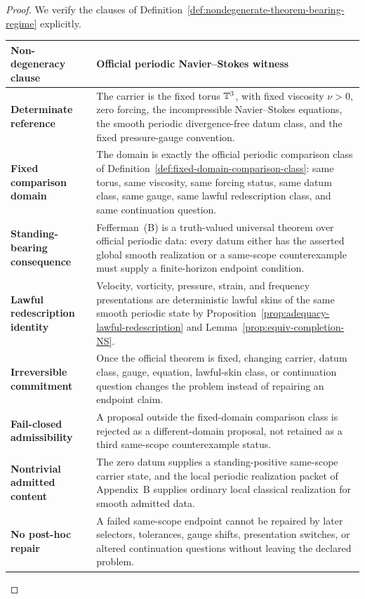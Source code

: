 \begin{proof}
We verify the clauses of Definition~\ref{def:nondegenerate-theorem-bearing-regime} explicitly.
\begin{center}
\footnotesize
\renewcommand{\arraystretch}{1.12}
\setlength{\tabcolsep}{4pt}
\begin{tabularx}{0.98\textwidth}{@{}L{0.31\textwidth}Y@{}}
\toprule
\textbf{Non-degeneracy clause} & \textbf{Official periodic Navier--Stokes witness}\\
\midrule
\textbf{Determinate reference} & The carrier is the fixed torus $\mathbb{T}^3$, with fixed viscosity $\nu>0$, zero forcing, the incompressible Navier--Stokes equations, the smooth periodic divergence-free datum class, and the fixed pressure-gauge convention.\\
\textbf{Fixed comparison domain} & The domain is exactly the official periodic comparison class of Definition~\ref{def:fixed-domain-comparison-class}: same torus, same viscosity, same forcing status, same datum class, same gauge, same lawful redescription class, and same continuation question.\\
\textbf{Standing-bearing consequence} & Fefferman~(B) is a truth-valued universal theorem over official periodic data: every datum either has the asserted global smooth realization or a same-scope counterexample must supply a finite-horizon endpoint condition.\\
\textbf{Lawful redescription identity} & Velocity, vorticity, pressure, strain, and frequency presentations are deterministic lawful skins of the same smooth periodic state by Proposition~\ref{prop:adequacy-lawful-redescription} and Lemma~\ref{prop:equiv-completion-NS}.\\
\textbf{Irreversible commitment} & Once the official theorem is fixed, changing carrier, datum class, gauge, equation, lawful-skin class, or continuation question changes the problem instead of repairing an endpoint claim.\\
\textbf{Fail-closed admissibility} & A proposal outside the fixed-domain comparison class is rejected as a different-domain proposal, not retained as a third same-scope counterexample status.\\
\textbf{Nontrivial admitted content} & The zero datum supplies a standing-positive same-scope carrier state, and the local periodic realization packet of Appendix~B supplies ordinary local classical realization for smooth admitted data.\\
\textbf{No post-hoc repair} & A failed same-scope endpoint cannot be repaired by later selectors, tolerances, gauge shifts, presentation switches, or altered continuation questions without leaving the declared problem.\\

\end{tabularx}
\end{center}
\end{proof}

